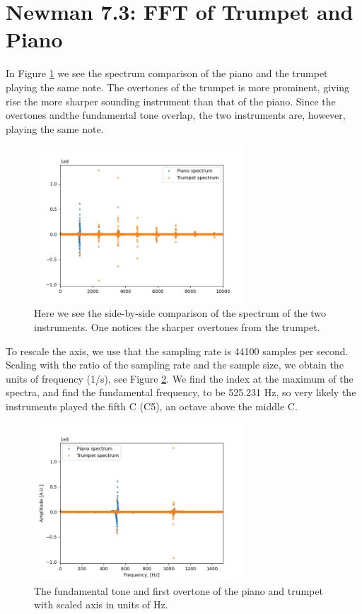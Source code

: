 \documentclass[11pt]{article}
\begin{document}
\section{Newman 7.3: FFT of Trumpet and Piano}
In Figure \ref{fft1} we see the spectrum comparison of the piano and the trumpet playing the same note. The overtones of the trumpet is more prominent, giving rise the more sharper sounding instrument than that of the piano. Since the overtones andthe fundamental tone overlap, the two instruments are, however, playing the same note. 

\begin{figure}[!htbp]
    \centering
    \includegraphics[width=0.7\textwidth]{pianotrumpet1.png}
    \caption{Here we see the side-by-side comparison of the spectrum of the two instruments. One notices the sharper overtones from the trumpet.}
    \label{fft1}
\end{figure}


To rescale the axis, we use that the sampling rate is 44100 samples per second. Scaling with the ratio of the sampling rate and the sample size, we obtain the units of frequency (1/s), see Figure \ref{C}. We find the index at the maximum of the spectra, and find the fundamental frequency, to be 525.231 Hz, so very likely the instruments played the fifth C (C5), an octave above the middle C.


\begin{figure}[!htbp]
    \centering
    \includegraphics[width=0.7\textwidth]{C5.png}
    \caption{The fundamental tone and first overtone of the piano and trumpet with scaled axis in units of Hz.}
    \label{C}
\end{figure}
\end{document}
